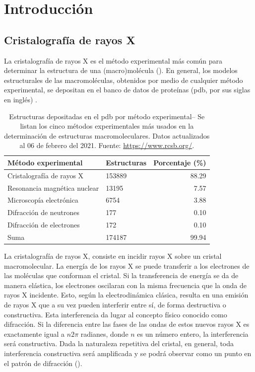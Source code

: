 \chapter{Introducción}
\section{Cristalografía de rayos X}
La cristalografía de rayos X es el método experimental más común para determinar la estructura de una (macro)molécula (). En general, los modelos estructurales de las macromoléculas, obtenidos por medio de cualquier método experimental, se depositan en el banco de datos de proteínas (\acrshort{pdb}, por sus siglas en inglés) . %

\begin{table}[h]
	\centering
	\begin{tabular}{@{}llr@{}}
		\toprule
		Método experimental & Estructuras  & Porcentaje (\si{\percent})       \\ 
		\midrule
		Cristalografía de rayos X        & 153889 & 88.29 \\
		Resonancia magnética nuclear & 13195  & 7.57  \\
		Microscopía electrónica      & 6754   & 3.88  \\
		Difracción de neutrones	     & 177    & 0.10  \\
		Difracción de electrones     & 172    & 0.10  \\
		\midrule
		Suma                         & 174187 & 99.94 \\ \bottomrule
	\end{tabular}%
	\caption[Estructuras por método experimental]{Estructuras depositadas en el \acrshort{pdb} por método experimental-- Se listan los cinco métodos experimentales más usados en la determinación de estructuras macromoleculares. Datos actualizados al 06 de febrero del 2021. Fuente: \url{https://www.rcsb.org/}.}
\end{table}

La cristalografía de rayos X, consiste en incidir rayos X sobre un cristal macromolecular. La energía de los rayos X se puede transferir a los electrones de las moléculas que conforman el cristal. Si la transferencia de energía se da de manera elástica, los electrones oscilaran con la misma frecuencia que la onda de rayos X incidente. Esto, según la electrodinámica clásica, resulta en una emisión de rayos X que a su vez pueden interferir entre sí, de forma destructiva o constructiva. Esta interferencia da lugar al concepto físico conocido como difracción. Si la diferencia entre las fases de las ondas de estos nuevos rayos X es exactamente igual a $n2\pi$ radianes, donde $n$ es un número entero, la interferencia será constructiva. Dada la naturaleza repetitiva del cristal, en general, toda interferencia constructiva será amplificada y se podrá observar como un punto en el patrón de difracción ().

